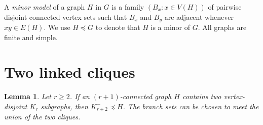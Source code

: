 \documentclass[11pt]{amsart}
\newtheorem{lemma}[theorem]{Lemma}
\newcommand{\minor}{\preccurlyeq}
\begin{document}
A \emph{minor model} of a graph $H$ in $G$ is a family
$(B_x:x\in V(H))$ of pairwise disjoint connected vertex sets such that
$B_x$ and $B_y$ are adjacent whenever $xy\in E(H)$.  We use
$H\minor G$ to denote that $H$ is a minor of $G$.  All graphs are finite
and simple.

\section{Two linked cliques}

\begin{lemma}\label{lem:disjoint-cliques}
Let $r\geq2$.  If an $(r+1)$-connected graph $H$ contains two
vertex-disjoint $K_r$ subgraphs, then $K_{r+2}^{-}\minor H$.  The branch
sets can be chosen to meet the union of the two cliques.
\end{lemma}
\end{document}
